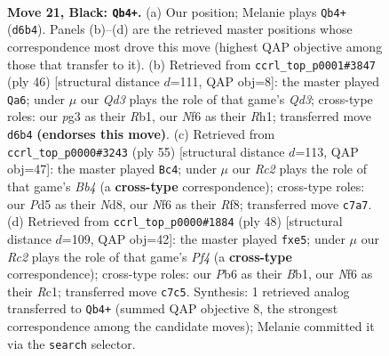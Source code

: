 \documentclass[11pt]{article}
\begin{document}
\clearpage

\begin{figure}[p]\centering
\begin{subfigure}{0.46\textwidth}\centering
\resizebox{\linewidth}{!}{%
\newchessgame
\chessboard[
  setfen={rnb3k1/2r2p2/Pp1q1np1/1N1p2Np/P2P1P1P/R2B2P1/3K4/3Q3R b - - 2 21},
  showmover=false,
  pgfstyle=straightmove, color=movearrow, markmove={d6-b4}
]}
\caption{}
\end{subfigure}\hfill
\begin{subfigure}{0.46\textwidth}\centering
\resizebox{\linewidth}{!}{%
\newchessgame
\chessboard[
  setfen={k1rq1b1r/p4p1p/2n1p1np/2PpP2N/8/P1PQBN2/5PP1/1R4KR w - - 1 24},
  showmover=false,
  pgfstyle=straightmove, color=movearrow, markmove={d3-a6}
]}
\caption{}
\end{subfigure}
\\[4pt]
\begin{subfigure}{0.46\textwidth}\centering
\resizebox{\linewidth}{!}{%
\newchessgame
\chessboard[
  setfen={3n1rk1/1p2n1p1/1q2p2p/1b1pP2P/pP1P1rP1/P1N1QNR1/6B1/1R5K b - - 1 28},
  showmover=false,
  pgfstyle=straightmove, color=movearrow, markmove={b5-c4}
]}
\caption{}
\end{subfigure}\hfill
\begin{subfigure}{0.46\textwidth}\centering
\resizebox{\linewidth}{!}{%
\newchessgame
\chessboard[
  setfen={1qr3k1/rb3pp1/p4n1p/1p2p3/1PnRPP2/PNNQ3P/6P1/1BR3K1 w - - 0 25},
  showmover=false,
  pgfstyle=straightmove, color=movearrow, markmove={f4-e5}
]}
\caption{}
\end{subfigure}
\caption{\textbf{Move 21, Black: \texttt{Qb4+}.} (a) Our position; Melanie plays \texttt{Qb4+} (\texttt{d6b4}). Panels (b)--(d) are the retrieved master positions whose correspondence most drove this move (highest QAP objective among those that transfer to it). (b) Retrieved from \texttt{ccrl\_top\_p0001\#3847} (ply 46) [structural distance $d$=111, QAP obj=8]: the master played \texttt{Qa6}; under $\mu$ our \emph{Qd3} plays the role of that game's \emph{Qd3}; cross-type roles: our \emph{p}g3 as their \emph{R}b1, our \emph{N}f6 as their \emph{R}h1; transferred move \texttt{d6b4} \textbf{(endorses this move)}. (c) Retrieved from \texttt{ccrl\_top\_p0000\#3243} (ply 55) [structural distance $d$=113, QAP obj=47]: the master played \texttt{Bc4}; under $\mu$ our \emph{Rc2} plays the role of that game's \emph{Bb4} (a \textbf{cross-type} correspondence); cross-type roles: our \emph{P}d5 as their \emph{N}d8, our \emph{N}f6 as their \emph{R}f8; transferred move \texttt{c7a7}. (d) Retrieved from \texttt{ccrl\_top\_p0000\#1884} (ply 48) [structural distance $d$=109, QAP obj=42]: the master played \texttt{fxe5}; under $\mu$ our \emph{Rc2} plays the role of that game's \emph{Pf4} (a \textbf{cross-type} correspondence); cross-type roles: our \emph{P}b6 as their \emph{B}b1, our \emph{N}f6 as their \emph{R}c1; transferred move \texttt{c7c5}. Synthesis: 1 retrieved analog transferred to \texttt{Qb4+} (summed QAP objective 8, the strongest correspondence among the candidate moves); Melanie committed it via the \texttt{search} selector.}
\label{fig:thought-m41}
\end{figure}
\end{document}
